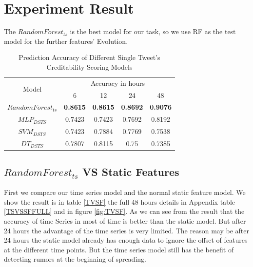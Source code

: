   \section{Experiment Result } 
  
  The $Random Forest_{ts}$ is the best model for our task, so we use RF as the test model for the further features' Evolution.
\begin{table}[]
\centering
\begin{tabular}{|c|cccc|}
\hline
\multicolumn{1}{|c|}{\multirow{2}{*}{Model}} & \multicolumn{4}{c|}{Accuracy in hours}                     \\ \cline{2-5} 
\multicolumn{1}{|l|}{}& 6 & 12 & 24 & \multicolumn{1}{c|}{48} \\\hline
 $Random Forest_{ts}$  & \textbf{0.8615} &  \textbf{0.8615}  &\textbf{ 0.8692} &  \textbf{0.9076 }\\
$MLP_{DSTS}$ & 0.7423  & 0.7423   &   0.7692   &  0.8192 \\
$SVM_{DSTS}$\cite{ma2015detect} & 0.7423  & 0.7884   &   0.7769   & 0.7538  \\
$DT_{DSTS}$\cite{ma2015detect}& 0.7807  & 0.8115   &  0.75 & 0.7385 \\    \bottomrule           
\end{tabular}
 \caption{Prediction Accuracy of Different Single Tweet's Creditability Scoring Models}
 \label{tab:time_result}
\end{table}

    \subsection{$Random Forest_{ts}$ VS Static Features} 

First we compare our time series model and the normal static feature model. We show the result is in table \ref{TVSF} the full 48 hours details in Appendix table \ref{TSVSSFFULL} and in figure \ref{fig:TVSF}. As we can see from the result that the accuracy of time Series in most of time is better than the static model. But after 24 hours the advantage of the time series is very limited. The reason may be after 24 hours the static model already has enough data to ignore the offset of features at the different time points. But the time series model still has the benefit of detecting rumors at the beginning of spreading. 
 
